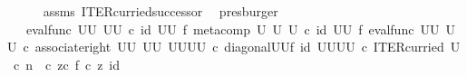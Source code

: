\begin{isabellebody}
\ \ \ \ \isamarkupfalse%
\ assms\ ITER{\isacharunderscore}{\kern0pt}curried{\isacharunderscore}{\kern0pt}successor\ \isamarkupfalse%
\ presburger\isanewline
\ \ \isamarkupfalse%
\ \isamarkupfalse%
\ {\isachardoublequoteopen}{\isachardot}{\kern0pt}{\isachardot}{\kern0pt}{\isachardot}{\kern0pt}\ {\isacharequal}{\kern0pt}\ {\isacharparenleft}{\kern0pt}eval{\isacharunderscore}{\kern0pt}func\ {\isacharparenleft}{\kern0pt}U\isactrlbsup U\isactrlesup {\isacharparenright}{\kern0pt}\ {\isacharparenleft}{\kern0pt}U\isactrlbsup U\isactrlesup {\isacharparenright}{\kern0pt}{\isacharparenright}{\kern0pt}\ {\isasymcirc}\isactrlsub c\ {\isacharparenleft}{\kern0pt}id\ {\isacharparenleft}{\kern0pt}U\isactrlbsup U\isactrlesup {\isacharparenright}{\kern0pt}\ {\isasymtimes}\isactrlsub f\ {\isacharparenleft}{\kern0pt}{\isacharparenleft}{\kern0pt}meta{\isacharunderscore}{\kern0pt}comp\ U\ U\ U\ {\isasymcirc}\isactrlsub c\ {\isacharparenleft}{\kern0pt}id\ {\isacharparenleft}{\kern0pt}U\isactrlbsup U\isactrlesup {\isacharparenright}{\kern0pt}\ {\isasymtimes}\isactrlsub f\ eval{\isacharunderscore}{\kern0pt}func\ {\isacharparenleft}{\kern0pt}U\isactrlbsup U\isactrlesup {\isacharparenright}{\kern0pt}\ {\isacharparenleft}{\kern0pt}U\isactrlbsup U\isactrlesup {\isacharparenright}{\kern0pt}{\isacharparenright}{\kern0pt}\ {\isasymcirc}\isactrlsub c\ {\isacharparenleft}{\kern0pt}associate{\isacharunderscore}{\kern0pt}right\ {\isacharparenleft}{\kern0pt}U\isactrlbsup U\isactrlesup {\isacharparenright}{\kern0pt}\ {\isacharparenleft}{\kern0pt}U\isactrlbsup U\isactrlesup {\isacharparenright}{\kern0pt}\ {\isacharparenleft}{\kern0pt}{\isacharparenleft}{\kern0pt}U\isactrlbsup U\isactrlesup {\isacharparenright}{\kern0pt}\isactrlbsup U\isactrlbsup U\isactrlesup \isactrlesup {\isacharparenright}{\kern0pt}{\isacharparenright}{\kern0pt}\ {\isasymcirc}\isactrlsub c\ {\isacharparenleft}{\kern0pt}diagonal{\isacharparenleft}{\kern0pt}U\isactrlbsup U\isactrlesup {\isacharparenright}{\kern0pt}{\isasymtimes}\isactrlsub f\ id\ {\isacharparenleft}{\kern0pt}{\isacharparenleft}{\kern0pt}U\isactrlbsup U\isactrlesup {\isacharparenright}{\kern0pt}\isactrlbsup U\isactrlbsup U\isactrlesup \isactrlesup {\isacharparenright}{\kern0pt}{\isacharparenright}{\kern0pt}{\isacharparenright}{\kern0pt}\isactrlsup {\isasymsharp}\ {\isasymcirc}\isactrlsub c\ ITER{\isacharunderscore}{\kern0pt}curried\ U{\isacharparenright}{\kern0pt}\ {\isasymcirc}\isactrlsub c\ {\isacharparenleft}{\kern0pt}n\ \ {\isasymcirc}\isactrlsub c\ z{\isacharparenright}{\kern0pt}{\isacharparenright}{\kern0pt}{\isasymcirc}\isactrlsub c\ {\isasymlangle}f\ {\isasymcirc}\isactrlsub c\ z{\isacharcomma}{\kern0pt}\ id\ {\isasymone}{\isasymrangle}{\isachardoublequoteclose}\isanewline

\end{isabellebody}
